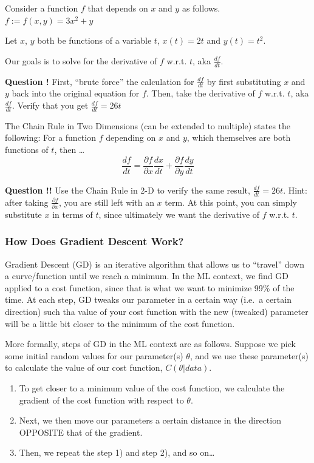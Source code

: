 \documentclass[
]{article}
\providecommand{\tightlist}{%
  \setlength{\itemsep}{0pt}\setlength{\parskip}{0pt}}
\begin{document}
Consider a function \(f\) that depends on \(x\) and \(y\) as follows.
\(f := f(x,y) = 3x^2 + y\)

Let \(x\), \(y\) both be functions of a variable \(t\), \(x(t) = 2t\)
and \(y(t) = t^2\).

Our goals is to solve for the derivative of \(f\) w.r.t. \(t\), aka
\(\frac{df}{dt}\).

\textbf{Question !} First, ``brute force'' the calculation for
\(\frac{df}{dt}\) by first substituting \(x\) and \(y\) back into the
original equation for \(f\). Then, take the derivative of \(f\) w.r.t.
\(t\), aka \(\frac{df}{dt}\). Verify that you get
\(\frac{df}{dt} = 26t\)

The Chain Rule in Two Dimensions (can be extended to multiple) states
the following: For a function \(f\) depending on \(x\) and \(y\), which
themselves are both functions of \(t\), then \ldots{} \[ 
\frac{df}{dt} = \frac{\partial f}{\partial x} \frac{dx}{dt} + \frac{\partial f}{\partial y} \frac{dy}{dt}
\]

\textbf{Question !!} Use the Chain Rule in 2-D to verify the same
result, \(\frac{df}{dt} = 26t\). Hint: after taking
\(\frac{\partial f}{\partial x}\), you are still left with an \(x\)
term. At this point, you can simply substitute \(x\) in terms of \(t\),
since ultimately we want the derivative of \(f\) w.r.t. \(t\).

\hypertarget{how-does-gradient-descent-work}{%
\subsubsection{How Does Gradient Descent
Work?}\label{how-does-gradient-descent-work}}

Gradient Descent (GD) is an iterative algorithm that allows us to
``travel'' down a curve/function until we reach a minimum. In the ML
context, we find GD applied to a cost function, since that is what we
want to minimize 99\% of the time. At each step, GD tweaks our parameter
in a certain way (i.e.~a certain direction) such tha value of your cost
function with the new (tweaked) parameter will be a little bit closer to
the minimum of the cost function.

More formally, steps of GD in the ML context are as follows. Suppose we
pick some initial random values for our parameter(s) \(\theta\), and we
use these parameter(s) to calculate the value of our cost function,
\(C(\theta|data)\).

\begin{enumerate}
\def\labelenumi{\arabic{enumi})}
\tightlist
\item
  To get closer to a minimum value of the cost function, we calculate
  the gradient of the cost function with respect to \(\theta\).
\item
  Next, we then move our parameters a certain distance in the direction
  OPPOSITE that of the gradient.
\item
  Then, we repeat the step 1) and step 2), and so on\ldots{}
\end{enumerate}
\end{document}
